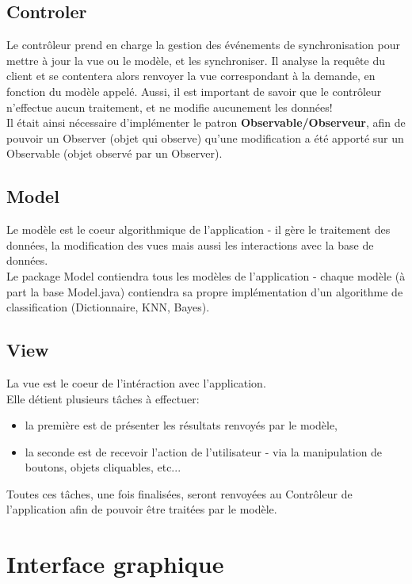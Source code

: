 \documentclass[pdftex,12pt,a4paper]{report}
\begin{document}
\begin{spacing}{1.2}
\subsection{Controler}

Le contrôleur prend en charge la gestion des événements de synchronisation pour mettre à jour la vue ou le modèle, et les synchroniser. Il analyse la requête du client et se contentera alors renvoyer la vue correspondant à la demande, en fonction du modèle appelé. Aussi, il est important de savoir que le contrôleur n'effectue aucun traitement, et ne modifie aucunement les données!
\\
Il était ainsi nécessaire d'implémenter le patron \textbf{Observable/Observeur}, afin de pouvoir un Observer (objet qui observe) qu'une modification a été apporté sur un Observable (objet observé par un Observer).

\subsection{Model}

Le modèle est le coeur algorithmique de l'application - il gère le traitement des données, la modification des vues mais aussi les interactions avec la base de données.
\\
Le package Model contiendra tous les modèles de l'application - chaque modèle (à part la base Model.java) contiendra sa propre implémentation d'un algorithme de classification (Dictionnaire, KNN, Bayes).

\subsection{View}

La vue est le coeur de l'intéraction avec l'application.
\\
Elle détient plusieurs tâches à effectuer:
\begin{itemize}
\item{la première est de présenter les résultats renvoyés par le modèle,}
\item{la seconde est de recevoir l'action de l'utilisateur - via la manipulation de boutons, objets cliquables, etc...}
\end{itemize}
Toutes ces tâches, une fois finalisées, seront renvoyées au Contrôleur de l'application afin de pouvoir être traitées par le modèle.

\section{Interface graphique}


\end{spacing}
\end{document}
